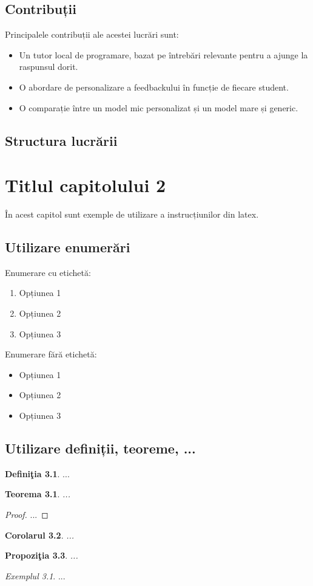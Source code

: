 \documentclass[12pt,a4paper]{report}
\newtheorem{thm}{Teorema}[section]
\newtheorem{cor}[thm]{Corolarul}
\newtheorem{prop}[thm]{Propozi\c tia}
\theoremstyle{definition}
\newtheorem{defn}{Defini\c tia}[section]
\theoremstyle{remark}
\newtheorem{exmp}{Exemplul}[section]
\begin{document}
\section{Contribuții}
Principalele contribuții ale acestei lucrări sunt:
\begin{itemize}
    \item Un tutor local de programare, bazat pe întrebări relevante pentru a ajunge la raspunsul dorit.
    \item O abordare de personalizare a feedbackului în funcție de fiecare student.
    \item O comparație între un model mic personalizat și un model mare și generic.
\end{itemize}

\section{Structura lucrării}



\chapter{Titlul capitolului 2}

În acest capitol sunt  exemple de utilizare a instrucțiunilor din latex.

\section{Utilizare enumerări}
Enumerare cu etichetă:
\begin{enumerate}
    \item Opțiunea 1
    \item Opțiunea 2
    \item Opțiunea 3
\end{enumerate}

Enumerare fără etichetă:
\begin{itemize}
    \item Opțiunea 1
    \item Opțiunea 2
    \item Opțiunea 3
\end{itemize}

\section{Utilizare definiții, teoreme, ...}
\begin{defn} ...
\end{defn}
\begin{thm} ...
\end{thm}
\begin{proof} ...
\end{proof}
\begin{cor} ...
\end{cor}
\begin{prop} ...
\end{prop}
\begin{exmp} ...
\end{exmp}
\end{document}
